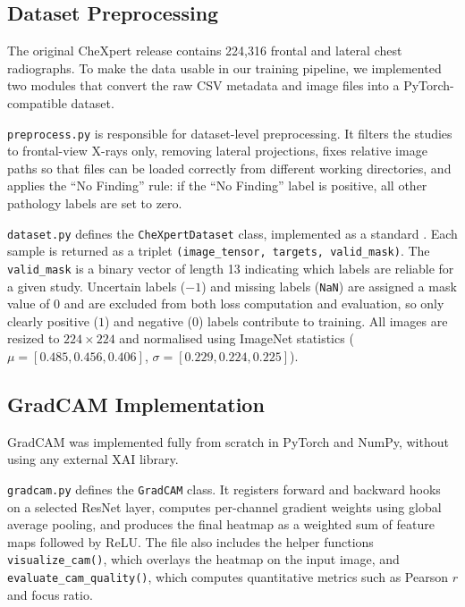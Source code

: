 \documentclass[12pt]{article}
\begin{document}
\subsection{Dataset Preprocessing}

The original CheXpert release contains 224,316 frontal and lateral chest radiographs. To make the data usable in our training pipeline, we implemented two modules that convert the raw CSV metadata and image files into a PyTorch-compatible dataset.

\texttt{preprocess.py} is responsible for dataset-level preprocessing. It filters the studies to frontal-view X-rays only, removing lateral projections, fixes relative image paths so that files can be loaded correctly from different working directories, and applies the ``No Finding'' rule: if the ``No Finding'' label is positive, all other pathology labels are set to zero.

\texttt{dataset.py} defines the \texttt{CheXpertDataset} class, implemented as a standard . Each sample is returned as a triplet \texttt{(image\_tensor, targets, valid\_mask)}. The \texttt{valid\_mask} is a binary vector of length 13 indicating which labels are reliable for a given study. Uncertain labels ($-1$) and missing labels (\texttt{NaN}) are assigned a mask value of 0 and are excluded from both loss computation and evaluation, so only clearly positive ($1$) and negative ($0$) labels contribute to training. All images are resized to $224\times224$ and normalised using ImageNet statistics ($\mu = [0.485, 0.456, 0.406]$, $\sigma = [0.229, 0.224, 0.225]$).

\subsection{GradCAM Implementation}

GradCAM was implemented fully from scratch in PyTorch and NumPy, without using any external XAI library.

\texttt{gradcam.py} defines the \texttt{GradCAM} class. It registers forward and backward hooks on a selected ResNet layer, computes per-channel gradient weights using global average pooling, and produces the final heatmap as a weighted sum of feature maps followed by ReLU. The file also includes the helper functions \texttt{visualize\_cam()}, which overlays the heatmap on the input image, and \texttt{evaluate\_cam\_quality()}, which computes quantitative metrics such as Pearson $r$ and focus ratio.
\end{document}
